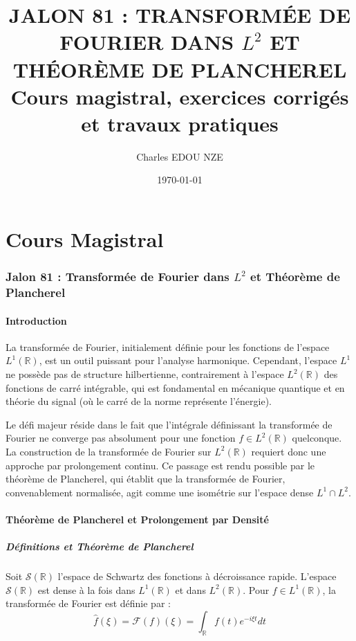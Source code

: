 \documentclass[11pt,a4paper]{article}
\title{\Huge JALON 81 : TRANSFORMÉE DE FOURIER DANS $L^2$ ET THÉORÈME DE PLANCHEREL \\ \large Cours magistral, exercices corrigés et travaux pratiques}
\author{\Large Charles EDOU NZE}
\date{\today}
\begin{document}
\maketitle
\tableofcontents
\newpage

\part{Cours Magistral}
\section{Jalon 81 : Transformée de Fourier dans $L^2$ et Théorème de Plancherel}

\subsection*{Introduction}

La transformée de Fourier, initialement définie pour les fonctions de l'espace $L^1(\mathbb{R})$, est un outil puissant pour l'analyse harmonique. Cependant, l'espace $L^1$ ne possède pas de structure hilbertienne, contrairement à l'espace $L^2(\mathbb{R})$ des fonctions de carré intégrable, qui est fondamental en mécanique quantique et en théorie du signal (où le carré de la norme représente l'énergie).

Le défi majeur réside dans le fait que l'intégrale définissant la transformée de Fourier ne converge pas absolument pour une fonction $f \in L^2(\mathbb{R})$ quelconque. La construction de la transformée de Fourier sur $L^2(\mathbb{R})$ requiert donc une approche par prolongement continu. Ce passage est rendu possible par le théorème de Plancherel, qui établit que la transformée de Fourier, convenablement normalisée, agit comme une isométrie sur l'espace dense $L^1 \cap L^2$.

\subsection*{Théorème de Plancherel et Prolongement par Densité}

\subsubsection*{Définitions et Théorème de Plancherel}

Soit $\mathcal{S}(\mathbb{R})$ l'espace de Schwartz des fonctions à décroissance rapide. L'espace $\mathcal{S}(\mathbb{R})$ est dense à la fois dans $L^1(\mathbb{R})$ et dans $L^2(\mathbb{R})$. Pour $f \in L^1(\mathbb{R})$, la transformée de Fourier est définie par :
$$ \hat{f}(\xi) = \mathcal{F}(f)(\xi) = \int_{\mathbb{R}} f(t) e^{-i\xi t} dt $$
\end{document}
